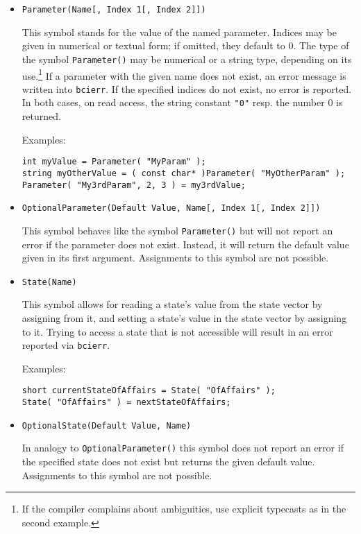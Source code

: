 \documentclass[12pt,a4paper]{article}
\begin{document}
\begin{itemize}
\item {\texttt{Parameter(Name[, Index 1[, Index 2]])}}

This symbol stands for the value of the named parameter. 
Indices may be given in numerical or textual form; if omitted,
they default to 0.
The type of the symbol \texttt{Parameter()} may be numerical or
a string type, depending on its use.\footnote{If the compiler
complains about ambiguities, use explicit typecasts as in the
second example.}
If a parameter with the given name does not
exist, an error message is written into \texttt{bcierr}.
If the specified indices do not exist,
no error is reported. In both cases, on read access, the
string constant \texttt{"0"} resp. the number 0 is returned.

Examples:
\begin{verbatim}
int myValue = Parameter( "MyParam" );
string myOtherValue = ( const char* )Parameter( "MyOtherParam" );
Parameter( "My3rdParam", 2, 3 ) = my3rdValue; 
\end{verbatim}

\item \texttt{OptionalParameter(Default Value, Name[, Index 1[, Index 2]])}

This symbol behaves like the symbol \texttt{Parameter()} but will not report
an error if the parameter does not exist. Instead, it will return the
default value given in its first argument. Assignments to this symbol are
not possible.

\item \texttt{State(Name)}

This symbol allows for reading a state's value from the state vector by
assigning from it, and setting a state's value in the state vector by
assigning to it. Trying to access a state that is not accessible will
result in an error reported via \texttt{bcierr}.

Examples:
\begin{verbatim}
short currentStateOfAffairs = State( "OfAffairs" );
State( "OfAffairs" ) = nextStateOfAffairs;
\end{verbatim}

\item \texttt{OptionalState(Default Value, Name)}

In analogy to \texttt{OptionalParameter()} this symbol does not report
an error if the specified state does not exist but returns the given default
value. Assignments to this symbol are not possible.


\end{itemize}
\end{document}
